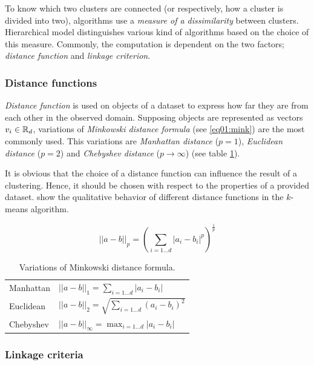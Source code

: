 To know which two clusters are connected (or respectively, how a cluster is divided into two), algorithms use a \emph{measure of a dissimilarity} between clusters.  
Hierarchical model distinguishes various kind of algorithms based on the choice of this measure. Commonly, the computation is dependent on the two factors; \emph{distance function} and \emph{linkage criterion}. 

\subsubsection{Distance functions}

\emph{Distance function} is used on objects of a dataset to express how far they are from each other in the observed domain. Supposing objects are represented as vectors $v_i \in \mathbb{R}_d$, variations of \emph{Minkowski distance formula} (see \ref{eq01:mink}) are the most commonly used.
This variations are \emph{Manhattan distance} ($p=1$), \emph{Euclidean distance} ($p=2$) and \emph{Chebyshev distance} ($p \to \infty$) (see table \ref{tab01:mink}).

It is obvious that the choice of a distance function can influence the result of a clustering. Hence, it should be chosen with respect to the properties of a provided dataset. \citet{aggarwal2001surprising} show the qualitative behavior of different distance functions in the $k$-means algorithm.  

\begin{equation}\label{eq01:mink}
||a-b||_p = (\sum_{i=1...d}|a_i-b_i|^p)^{\frac{1}{p}}
\end{equation}

\begin{table}
	\centering
	\begin{tabular}{ll}
		\toprule
		Manhattan & $||a-b||_1 = \sum_{i=1...d}|a_i-b_i|$          \\
		Euclidean & $||a-b||_2 = \sqrt{\sum_{i=1...d}(a_i-b_i)^2}$ \\
		Chebyshev & $||a-b||_\infty = \max_{i=1\dots d}|a_i-b_i|$  \\ \bottomrule
	\end{tabular}
	\caption{Variations of Minkowski distance formula.}
	\label{tab01:mink}
\end{table}

\subsubsection{Linkage criteria}

